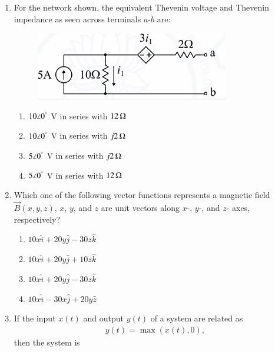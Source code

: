 \documentclass[journal,12pt,onecolumn]{IEEEtran}
\theoremstyle{remark}
\begin{document}
\begin{flushleft}
\begin{enumerate}
\item For the network shown, the equivalent Thevenin voltage and Thevenin impedance as seen across terminals $a$-$b$ are:
\begin{figure}[H]
    \centering
    \includegraphics[width=0.5\columnwidth]{figs/14.png}
    \caption{}
    \label{fig:placeholder}
\end{figure}

\begin{enumerate}
\item $10 \angle 0^\degree$ V in series with $12\,\ohm$
\item $10 \angle 0^\degree$ V in series with $j2\,\ohm$
\item $5 \angle 0^\degree$ V in series with $j2\,\ohm$
\item $5 \angle 0^\degree$ V in series with $12\,\ohm$
\end{enumerate}


\item Which one of the following vector functions represents a magnetic field $\vec{B}(x,y,z)$, $x$, $y$, and $z$ are unit vectors along $x$-, $y$-, and $z$- axes, respectively?

\begin{enumerate}
\item $10x\hat{i}+20y\hat{j}-30z\hat{k}$
\item $10x\hat{i}+20y\hat{j}+10z\hat{k}$
\item $10x\hat{i}+20y\hat{j}-30z\hat{k}$
\item $10x\hat{i}-30x\hat{j}+20y\hat{z}$
\end{enumerate}










\item If the input $x(t)$ and output $y(t)$ of a system are related as  
\begin{align*}
    y(t) = \max(x(t),0),
\end{align*}
then the system is

\begin{enumerate}
\end{enumerate}



\end{enumerate}
\end{flushleft}
\end{document}
